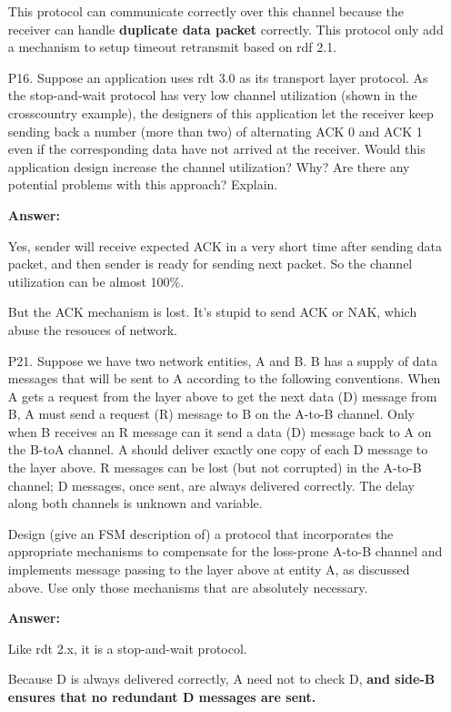 \begin{enumerate}
    This protocol can communicate correctly over this channel because the receiver can handle \textbf{duplicate data packet} correctly. This protocol only add a mechanism to setup timeout retransmit based on rdf 2.1.
	
	\item[P16.] Suppose an application uses rdt 3.0 as its transport layer protocol. As the stop-and-wait protocol has very low channel utilization (shown in the crosscountry example), the designers of this application let the receiver keep sending back a number (more than two) of alternating ACK 0 and ACK 1 even if the corresponding data have not arrived at the receiver. Would this application design increase the channel utilization? Why? Are there any potential problems with this approach? Explain.
	
	\textbf{Answer:}
	
	Yes, sender will receive expected ACK in a very short time after sending data packet, and then sender is ready for sending next packet. So the channel utilization can be almost 100\%.
	
	But the ACK mechanism is lost. It's stupid to send ACK or NAK, which abuse the resouces of network.
	
	\item[P21.] Suppose we have two network entities, A and B. B has a supply of data messages that will be sent to A according to the following conventions. When A	gets a request from the layer above to get the next data (D) message from B, A must send a request (R) message to B on the A-to-B channel. Only when B	receives an R message can it send a data (D) message back to A on the B-toA channel. A should deliver exactly one copy of each D message to the layer	above. R messages can be lost (but not corrupted) in the A-to-B channel; D	messages, once sent, are always delivered correctly. The delay along both channels is unknown and variable. 
	
	Design (give an FSM description of) a protocol that incorporates the appropriate mechanisms to compensate for the loss-prone A-to-B channel and implements message passing to the layer above at entity A, as discussed above. Use only those mechanisms that are absolutely necessary.
	
	\textbf{Answer:}
	
	Like rdt 2.x, it is a stop-and-wait protocol.
	
	Because D is always delivered correctly, A need not to check D, \textbf{and side-B ensures that no redundant D messages are sent.}
	

\end{enumerate}
